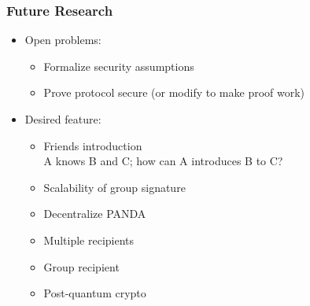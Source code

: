 \begin{frame}
	\frametitle{Future Research}

	\begin{itemize}
	\item	Open problems:
		\begin{itemize}
		\setlength\itemsep{0.3em}
		\item	Formalize security assumptions
		\item	Prove protocol secure (or modify to make proof work)
		\end{itemize}

	\vspace{0.5cm}
	\item	Desired feature:
		\begin{itemize}
		\setlength\itemsep{0.3em}
		\item	Friends introduction\\
			A knows B and C; how can A introduces B to C?
		\item	Scalability of group signature
		\item	Decentralize PANDA
		\item	Multiple recipients
		\item	Group recipient
		\item	Post-quantum crypto
		\end{itemize}
	\end{itemize}
\end{frame}
